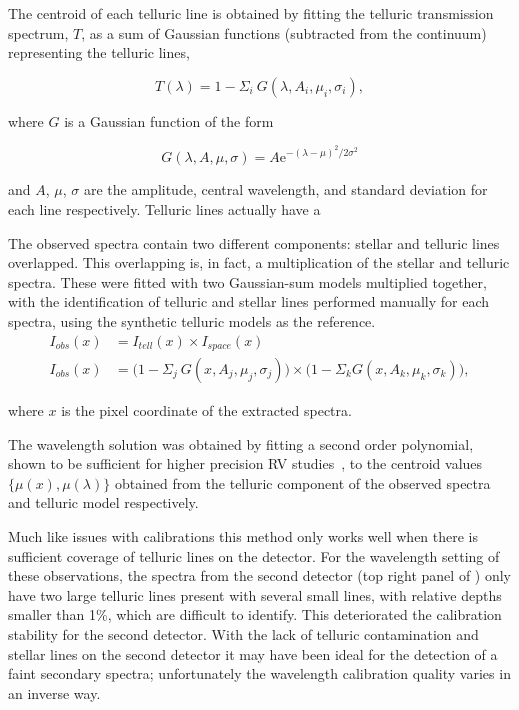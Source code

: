 The centroid of each telluric line is obtained by fitting the telluric transmission spectrum, \(T \), as a sum of Gaussian functions (subtracted from the continuum) representing the telluric lines,

\begin{equation}
T(\lambda) = 1 - {\Sigma}_{i}\ G(\lambda, A_{i}, {\mu}_{i}, {\sigma}_{i}),
\end{equation}

where \(G \) is a Gaussian function of the form

\begin{equation}
G(\lambda, A, \mu, \sigma) = {A \textrm{e}}^{{-(\lambda-\mu)}^{2}/2\sigma^{2}}
\end{equation}

and \(A \), \(\mu \), \(\sigma \) are the amplitude, central wavelength, and standard deviation for each line respectively. Telluric lines actually have a %

The observed spectra contain two different components: stellar and telluric lines overlapped. This overlapping is, in fact, a multiplication of the stellar and telluric spectra. These were fitted with two Gaussian-sum models multiplied together, with the identification of telluric and stellar lines performed manually for each spectra, using the synthetic telluric models as the reference.
\begin{align}
I_{obs}(x) &= I_{tell}(x) \times I_{space}(x) \nonumber \\
I_{obs}(x) &= \Big(1 - {\Sigma}_{j}\ G(x, A_{j}, {\mu}_{j}, {\sigma}_{j})\Big) \times \Big(1 - {\Sigma}_{k} G(x, A_{k}, {\mu}_{k}, {\sigma}_{k})\Big), \label{eqn:obs}
\end{align}

where \(x \) is the pixel coordinate of the extracted spectra.

The wavelength solution was obtained by fitting a second order polynomial, shown to be sufficient for higher precision RV studies~\citep[e.g.][]{bean_groundbased_2010, figueira_radial_2010}, to the centroid values \(\{\mu(x), \mu(\lambda)\} \) obtained from the telluric component of the observed spectra and telluric model respectively. 

Much like issues with \thar calibrations this method only works well when there is sufficient coverage of telluric lines on the detector. For the wavelength setting of these observations, the spectra from the second detector (top right panel of ) only have two large telluric lines present with several small lines, with relative depths smaller than 1\%, which are difficult to identify. This deteriorated the calibration stability for the second detector. With the lack of telluric contamination and stellar lines on the second detector it may have been ideal for the detection of a faint secondary spectra; unfortunately the wavelength calibration quality varies in an inverse way.

